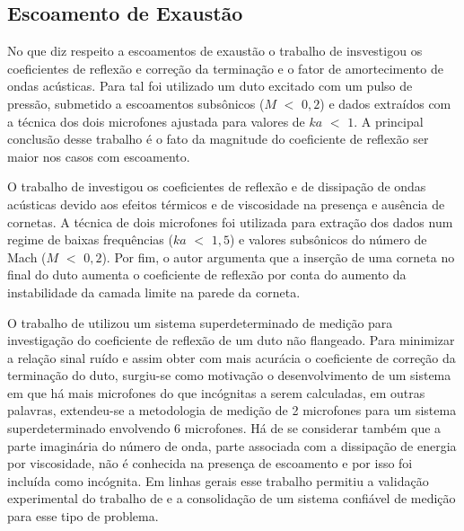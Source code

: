\subsection{Escoamento de Exaustão}

No que diz respeito a escoamentos de exaustão o trabalho de  insvestigou os coeficientes de reflexão e correção da terminação e o fator de amortecimento de ondas acústicas. Para tal foi utilizado um duto excitado com um pulso de pressão, submetido a escoamentos subsônicos ($M$ $<$ $0,2$) e dados extraídos com a técnica dos dois microfones ajustada para valores de $ka$ $<$ $1$. A principal conclusão desse trabalho é o fato da magnitude do coeficiente de reflexão ser maior nos casos com escoamento.

O trabalho de  investigou os coeficientes de reflexão e de dissipação de ondas acústicas devido aos efeitos térmicos e de viscosidade na presença e ausência de cornetas. A técnica de dois microfones foi utilizada para extração dos dados num regime de baixas frequências ($ka$ $<$ $1,5$) e valores subsônicos do número de Mach ($M$ $<$ $0,2$). Por fim, o autor argumenta que a inserção de uma corneta no final do duto aumenta o coeficiente de reflexão por conta do aumento da instabilidade da camada limite na parede da corneta.

O trabalho de  utilizou um sistema superdeterminado de medição para investigação do coeficiente de reflexão de um duto não flangeado. Para minimizar a relação sinal ruído e assim obter com mais acurácia o coeficiente de correção da terminação do duto, surgiu-se como motivação o desenvolvimento de um sistema em que há mais microfones do que incógnitas a serem calculadas, em outras palavras, extendeu-se a metodologia de medição de 2 microfones para um sistema superdeterminado envolvendo 6 microfones. Há de se considerar também que a parte imaginária do número de onda, parte associada com a dissipação de energia por viscosidade, não é conhecida na presença de escoamento e por isso foi incluída como incógnita. Em linhas gerais esse trabalho permitiu a validação experimental do trabalho de  e a consolidação de um sistema confiável de medição para esse tipo de problema.

